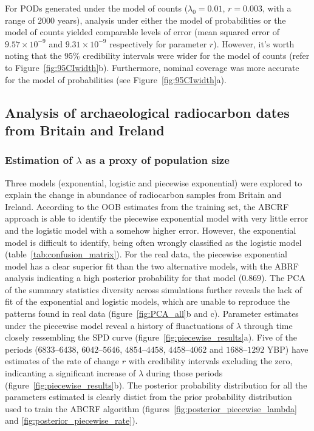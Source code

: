 \documentclass[a4paper]{article}
\begin{document}
For PODs generated under the model of counts ($\lambda_0=0.01$, $r=0.003$, with a range of $2000$ years), analysis under either the model of probabilities or the model of counts yielded comparable levels of error (mean squared error of $9.57\times10^{-9}$ and $9.31\times10^{-9}$ respectively for parameter $r$). However, it's worth noting that the 95\% credibility intervals were wider for the model of counts (refer to Figure~\ref{fig:95CIwidth}b). Furthermore, nominal coverage was more accurate for the model of probabilities (see Figure~\ref{fig:95CIwidth}a).
\\




\subsection*{Analysis of archaeological radiocarbon dates from Britain and Ireland}

\subsubsection*{Estimation of $\lambda$ as a proxy of population size}

Three models (exponential, logistic and piecewise exponential) were explored to explain the change in abundance of radiocarbon samples from Britain and Ireland. According to the OOB estimates from the training set, the ABCRF approach is able to identify the piecewise exponential model with very little error and the logistic model with a somehow higher error. However, the exponential model is difficult to identify, being often wrongly classified as the logistic model (table~\ref{tab:confusion_matrix}). For the real data, the piecewise exponential model has a clear superior fit than the two alternative models, with the ABRF analysis indicating a high posterior probability for that model ($0.869$). The PCA of the summary statistics diversity across simulations further reveals the lack of fit of the exponential and logistic models, which are unable to reproduce the patterns found in real data (figure~\ref{fig:PCA_all}b and c). Parameter estimates under the piecewise model reveal a history of fluactuations of $\lambda$ through time closely ressembling the SPD curve (figure~\ref{fig:piecewise_results}a). Five of the periods ($6833$--$6438$, $6042$--$5646$, $4854$--$4458$, $4458$--$4062$ and $1688$--$1292$ YBP) have estimates of the rate of change $r$ with credibility intervals excluding the zero, indicanting a significant increase of $\lambda$ during those periods (figure~\ref{fig:piecewise_results}b). The posterior probability distribution for all the parameters estimated is clearly distict from the prior probability distribution used to train the ABCRF algorithm (figures~\ref{fig:posterior_piecewise_lambda} and \ref{fig:posterior_piecewise_rate}).\\
\end{document}
